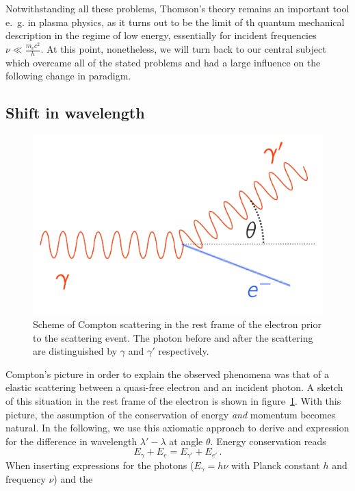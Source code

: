 Notwithstanding all these problems, Thomson's theory remains an important tool e.~g. in plasma physics, as it turns out to
be the limit of th quantum mechanical description in the regime of low energy, essentially for incident frequencies 
$\nu \ll \frac{m_ec^2}{h}$. At this point, nonetheless, we will turn back to our central subject which overcame all of the
stated problems and had a large influence on the following change in paradigm. 

\subsection{Shift in wavelength}
\label{sec:wavelength}
\begin{figure}[htpb]
    \centering
    \includegraphics[width=0.8\linewidth]{figures/compton_scatter}
    \caption{
        Scheme of Compton scattering in the rest frame of the electron prior to the scattering event. The photon before and
        after the scattering are distinguished by $\gamma$ and $\gamma'$ respectively. 
        }
    \label{fig:compton_scatter}
\end{figure}
Compton's picture in order to explain the observed phenomena was that of a elastic scattering between a quasi-free electron
and an incident photon. A sketch of this situation in the rest frame of the electron is shown in 
figure~\ref{fig:compton_scatter}. With this picture, the assumption of the conservation of energy \textit{and} momentum 
becomes natural. In the following, we use this axiomatic approach to derive and expression for the difference in
wavelength $\lambda' - \lambda$ at angle $\theta$. Energy conservation reads 
\begin{equation}
    E_\gamma + E_e =  E_{\gamma'} + E_{e'} \, .
    \label{eq:energy_conservation}
\end{equation}
When inserting expressions for the photons ($E_\gamma = h \nu$ with Planck constant $h$ and frequency $\nu$) and the 
